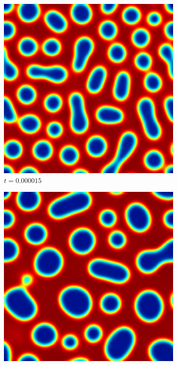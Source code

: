 \begin{figure}[ht]
	\begin{subfigure}[t]{.3\linewidth}
		\center
		\includegraphics[scale=.25]{stochastic_ch_3_15}
		\vspace{-.4\baselineskip}
		\caption{$t=0.000015$}
	\end{subfigure}
	\begin{subfigure}[t]{.3\linewidth}
		\center
		\includegraphics[scale=.25]{stochastic_ch_4_40}

\end{subfigure}
\end{figure}
